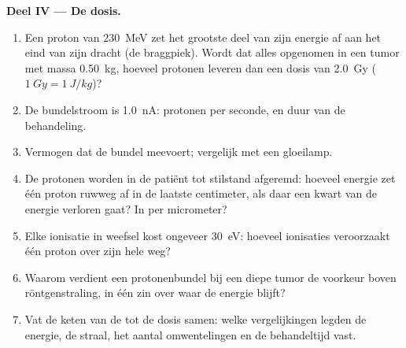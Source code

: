 \begin{problem}
\medskip
\noindent\textbf{Deel IV --- De dosis.}
\begin{enumerate}[resume]
  \item Een proton van \qty{230}{MeV} zet het grootste deel van zijn energie af
        aan het eind van zijn dracht (de braggpiek). Wordt dat alles opgenomen
        in een tumor met massa \qty{0.50}{kg}, hoeveel protonen leveren dan een
        dosis van \qty{2.0}{Gy} ($\qty{1}{Gy} = \qty{1}{J/kg}$)?
  \item De bundelstroom is \qty{1.0}{nA}: protonen per seconde, en
        duur van de behandeling.
  \item Vermogen dat de bundel meevoert; vergelijk met een gloeilamp.
  \item De protonen worden in de patiënt tot stilstand afgeremd: hoeveel
        energie zet één proton ruwweg af in de laatste centimeter, als
        daar een kwart van de energie verloren gaat? In  per
        micrometer?
  \item Elke ionisatie in weefsel kost ongeveer \qty{30}{eV}: hoeveel
        ionisaties veroorzaakt één proton over zijn hele weg?
  \item Waarom verdient een protonenbundel bij een diepe tumor de voorkeur boven
        röntgenstraling, in één zin over waar de energie blijft?
  \item Vat de keten van de  tot de dosis samen: welke
        vergelijkingen legden de energie, de straal, het aantal omwentelingen en
        de behandeltijd vast.
\end{enumerate}
\end{problem}
